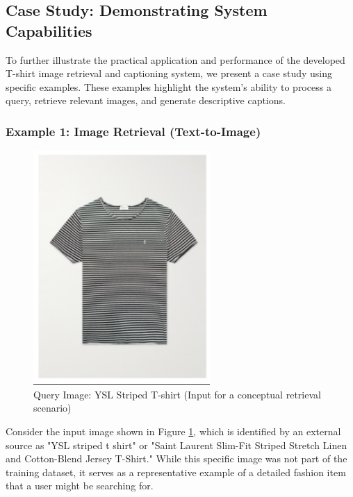 \documentclass{article}
\begin{document}
\subsection{Case Study: Demonstrating System Capabilities}
To further illustrate the practical application and performance of the developed T-shirt image retrieval and captioning system, we present a case study using specific examples. These examples highlight the system's ability to process a query, retrieve relevant images, and generate descriptive captions.

\subsubsection{Example 1: Image Retrieval (Text-to-Image)}
\begin{figure}[H]
    \centering
    \includegraphics[width=0.6\textwidth]{output_2.png}
    \caption{Query Image: YSL Striped T-shirt (Input for a conceptual retrieval scenario)}
    \label{fig:ysl_tshirt}
\end{figure}

Consider the input image shown in Figure \ref{fig:ysl_tshirt}, which is identified by an external source as "YSL striped t shirt" or "Saint Laurent Slim-Fit Striped Stretch Linen and Cotton-Blend Jersey T-Shirt." While this specific image was not part of the training dataset, it serves as a representative example of a detailed fashion item that a user might be searching for.
\end{document}
